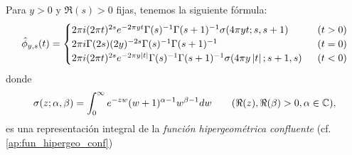 \documentclass[../../tesis_maestria]{subfiles}
\begin{document}
\begin{lema}%
  Para $y>0$ y $\Re(s)>0$ fijas, tenemos la siguiente f\'ormula:
  \begin{equation}\label{eq:trans_de_phi}
  \hat{\phi}_{y,s}(t)=
  \begin{cases}
    2\pi i(2\pi t)^{2s}e^{-2\pi yt}\Gamma(s)^{-1}\Gamma(s+1)^{-1}\sigma(4\pi yt;s,s+1) &\;\;(t>0)\\
    2\pi i\Gamma(2s)(2y)^{-2s}\Gamma(s)^{-1}\Gamma(s+1)^{-1} &\;\; (t=0)\\
    2\pi i(2\pi t)^{2s}e^{-2\pi y\abs{t}}\Gamma(s)^{-1}\Gamma(s+1)^{-1}\sigma(4\pi y\abs{t};s+1,s)%
    &\;\;(t<0)
  \end{cases} 
\end{equation}
donde
\[
  \sigma(z;\alpha,\beta)=\int_0^{\infty}e^{-zw}(w+1)^{\alpha-1}w^{\beta-1}dw
  \qquad(\Re(z),\Re(\beta)>0,\alpha\in\mathbb{C}),
\]
es una representaci\'on integral de la \emph{funci\'on hipergeom\'etrica confluente}
(cf. \ref{ap:fun_hipergeo_conf})
\end{lema}%
\end{document}
